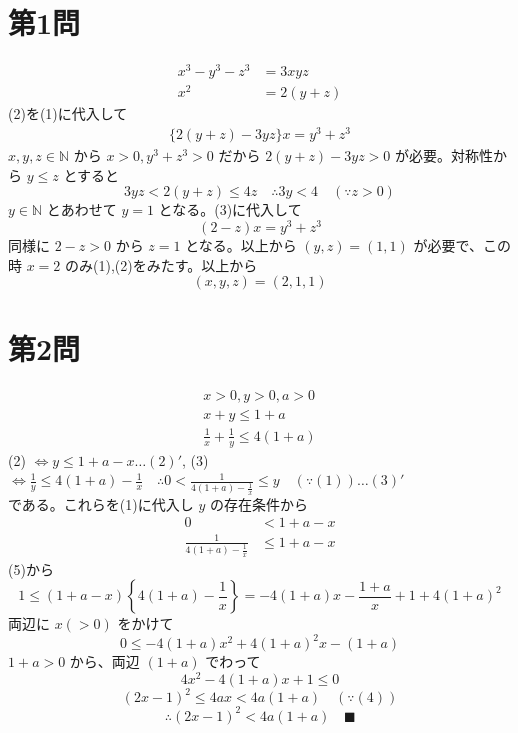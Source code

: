 \documentclass[../main.tex]{subfiles}
\begin{document}
\section*{第1問}

\noindent
[\textbf{解}]
\begin{align}
  x^3 - y^3 - z^3 &= 3xyz \tag{1} \\
  x^2 &= 2(y + z) \tag{2}
\end{align}
(2)を(1)に代入して
\begin{align}
  \{ 2(y+z) - 3yz \} x = y^3 + z^3 \tag{3}
\end{align}
$x, y, z \in \mathbb{N}$ から $x > 0, y^3 + z^3 > 0$ だから $2(y+z) - 3yz > 0$ が必要。対称性から $y \le z$ とすると
\[
  3yz < 2(y+z) \le 4z \quad \therefore 3y < 4 \quad (\because z > 0)
\]
$y \in \mathbb{N}$ とあわせて $y = 1$ となる。(3)に代入して
\[
  (2-z)x = y^3 + z^3
\]
同様に $2-z > 0$ から $z = 1$ となる。以上から $(y, z) = (1, 1)$ が必要で、この時 $x = 2$ のみ(1),(2)をみたす。以上から
\[
  (x, y, z) = (2, 1, 1)
\]

\newpage

\section*{第2問}

\noindent
[\textbf{解}]
\begin{align}
  x > 0, y > 0, a > 0 \tag{1} \\
  x + y \le 1 + a \tag{2} \\
  \frac{1}{x} + \frac{1}{y} \le 4(1+a) \tag{3}
\end{align}
(2) $\iff y \le 1 + a - x \dots (2)'$, \quad (3) $\iff \frac{1}{y} \le 4(1+a) - \frac{1}{x} \quad \therefore 0 < \frac{1}{4(1+a) - \frac{1}{x}} \le y \quad (\because (1)) \dots (3)'$\\
である。これらを(1)に代入し $y$ の存在条件から
\begin{align}
  0 &< 1 + a - x \tag{4} \\
  \frac{1}{4(1+a) - \frac{1}{x}} &\le 1 + a - x \tag{5}
\end{align}
(5)から
\[
  1 \le (1+a-x) \left\{ 4(1+a) - \frac{1}{x} \right\} = -4(1+a)x - \frac{1+a}{x} + 1 + 4(1+a)^2
\]
両辺に $x (>0)$ をかけて
\[
  0 \le -4(1+a)x^2 + 4(1+a)^2 x - (1+a)
\]
$1+a > 0$ から、両辺 $(1+a)$ でわって
\[
  4x^2 - 4(1+a)x + 1 \le 0
\]
\[
  (2x - 1)^2 \le 4ax < 4a(1+a) \quad (\because (4))
\]
\[
  \therefore (2x - 1)^2 < 4a(1+a) \quad \text{■}
\]

\newpage
\end{document}
